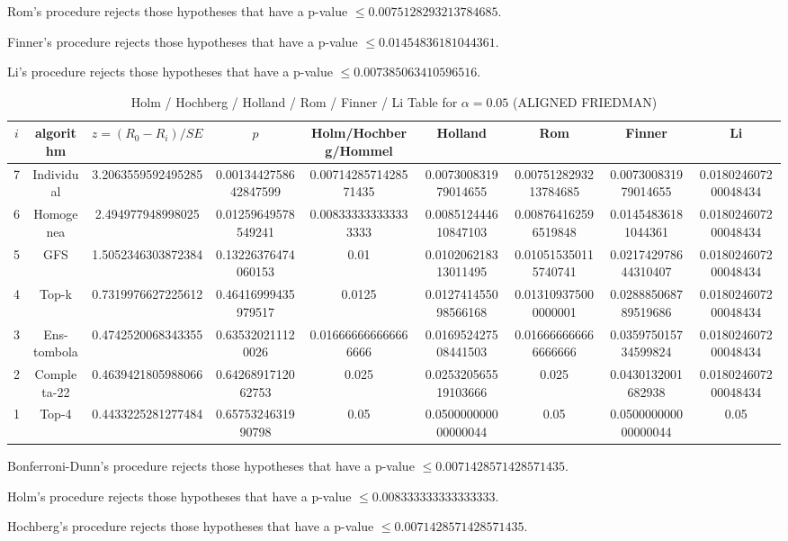\documentclass[a4paper,10pt]{article}
\begin{document}
\begin{landscape}
Rom's procedure rejects those hypotheses that have a p-value $\le0.0075128293213784685$.


Finner's procedure rejects those hypotheses that have a p-value $\le0.01454836181044361$.


Li's procedure rejects those hypotheses that have a p-value $\le0.007385063410596516$.



\newpage

\begin{table}[!htp]
\centering\scriptsize
\caption{Holm / Hochberg / Holland / Rom / Finner / Li Table for $\alpha=0.05$ (ALIGNED FRIEDMAN)}
\begin{tabular}{ccccccccc}
$i$&algorithm&$z=(R_0 - R_i)/SE$&$p$&Holm/Hochberg/Hommel&Holland&Rom&Finner&Li\\
\hline
7&Individual&3.2063559592495285&0.0013442758642847599&0.0071428571428571435&0.007300831979014655&0.0075128293213784685&0.007300831979014655&0.018024607200048434\\
6&Homogenea&2.494977948998025&0.01259649578549241&0.008333333333333333&0.008512444610847103&0.008764162596519848&0.01454836181044361&0.018024607200048434\\
5&GFS&1.5052346303872384&0.13226376474060153&0.01&0.010206218313011495&0.010515350115740741&0.021742978644310407&0.018024607200048434\\
4&Top-k&0.7319976627225612&0.46416999435979517&0.0125&0.012741455098566168&0.013109375000000001&0.028885068789519686&0.018024607200048434\\
3&Ens-tombola&0.4742520068343355&0.635320211120026&0.016666666666666666&0.016952427508441503&0.016666666666666666&0.035975015734599824&0.018024607200048434\\
2&Completa-22&0.4639421805988066&0.6426891712062753&0.025&0.025320565519103666&0.025&0.0430132001682938&0.018024607200048434\\
1&Top-4&0.4433225281277484&0.6575324631990798&0.05&0.050000000000000044&0.05&0.050000000000000044&0.05\\
\hline
\end{tabular}
\end{table}
Bonferroni-Dunn's procedure rejects those hypotheses that have a p-value $\le0.0071428571428571435$.


Holm's procedure rejects those hypotheses that have a p-value $\le0.008333333333333333$.


Hochberg's procedure rejects those hypotheses that have a p-value $\le0.0071428571428571435$.



\end{landscape}
\end{document}

